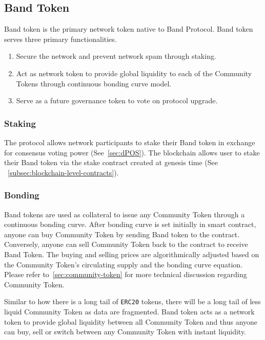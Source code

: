 \documentclass[letterpaper,11pt]{article}
\begin{document}
\subsection{Band Token}
Band token is the primary network token native to Band Protocol. Band token serves three primary functionalities.
\begin{enumerate}
\setlength\itemsep{0em}
\item Secure the network and prevent network spam through staking.
\item Act as network token to provide global liquidity to each of the Community Tokens through continuous bonding curve model.
\item Serve as a future governance token to vote on protocol upgrade.
\end{enumerate}

\subsubsection{Staking} \label{subsec:stake}
The protocol allows network participants to stake their Band token in exchange for consensus voting power (See~\cref{sec:dPOS}). The blockchain allows user to stake their Band token via the stake contract created at genesis time (See ~\cref{subsec:blockchain-level-contracts}).

\subsubsection{Bonding}
Band tokens are used as collateral to issue any Community Token through a continuous bonding curve. After bonding curve is set initially in smart contract, anyone can buy Community Token by sending Band token to the contract. Conversely, anyone can sell Community Token back to the contract to receive Band Token. The buying and selling prices are algorithmically adjusted based on the Community Token's circulating supply and the bonding curve equation. Please refer to~\cref{sec:community-token} for more technical discussion regarding Community Token.

Similar to how there is a long tail of {\tt ERC20} tokens, there will be a long tail of less liquid Community Token as data are fragmented. Band token acts as a network token to provide global liquidity between all Community Token and thus anyone can buy, sell or switch between any Community Token with instant liquidity.
\end{document}
